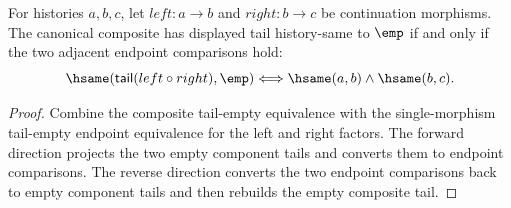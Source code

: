 \begin{theorem}
\label{thm:continuation-morphism-composite-tail-empty-endpoint-iff}
For histories $a,b,c$, let $left:a\to b$ and $right:b\to c$ be continuation
morphisms. The canonical composite has displayed tail history-same to $\emp$
if and only if the two adjacent endpoint comparisons hold:
$$
\hsame(\mathsf{tail}(left\circ right),\emp)
\Longleftrightarrow
\hsame(a,b)\wedge\hsame(b,c).
$$
\end{theorem}
\begin{proof}
Combine the composite tail-empty equivalence with the single-morphism
tail-empty endpoint equivalence for the left and right factors. The forward
direction projects the two empty component tails and converts them to endpoint
comparisons. The reverse direction converts the two endpoint comparisons back
to empty component tails and then rebuilds the empty composite tail.
\end{proof}

